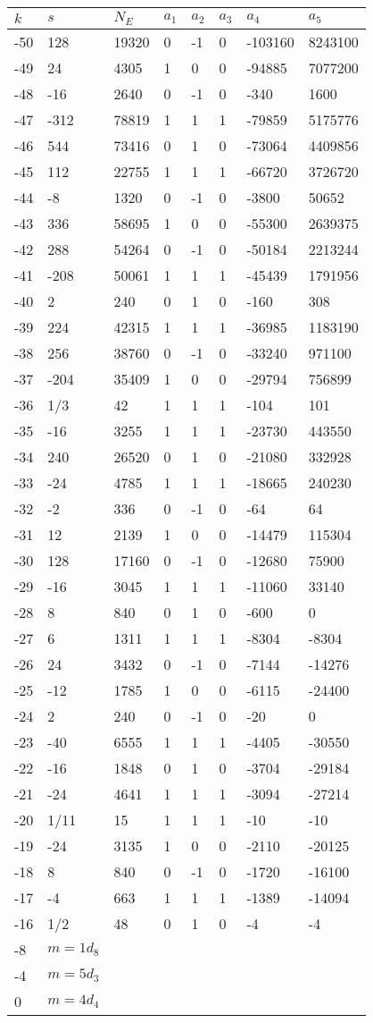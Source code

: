 \documentclass{amsart}
\begin{document}
\begin{longtable}{|l|l|l|lllll|}
\hline
$k$ & $s$ & $N_E$ & $a_1$ & $a_2$ & $a_3$ & $a_4$ & $a_5$\\
\hline
-50&128&19320&0&-1&0&-103160&8243100\\
-49&24&4305&1&0&0&-94885&7077200\\
-48&-16&2640&0&-1&0&-340&1600\\
-47&-312&78819&1&1&1&-79859&5175776\\
-46&544&73416&0&1&0&-73064&4409856\\
-45&112&22755&1&1&1&-66720&3726720\\
-44&-8&1320&0&-1&0&-3800&50652\\
-43&336&58695&1&0&0&-55300&2639375\\
-42&288&54264&0&-1&0&-50184&2213244\\
-41&-208&50061&1&1&1&-45439&1791956\\
-40&2&240&0&1&0&-160&308\\
-39&224&42315&1&1&1&-36985&1183190\\
-38&256&38760&0&-1&0&-33240&971100\\
-37&-204&35409&1&0&0&-29794&756899\\
-36&1/3&42&1&1&1&-104&101\\
-35&-16&3255&1&1&1&-23730&443550\\
-34&240&26520&0&1&0&-21080&332928\\
-33&-24&4785&1&1&1&-18665&240230\\
-32&-2&336&0&-1&0&-64&64\\
-31&12&2139&1&0&0&-14479&115304\\
-30&128&17160&0&-1&0&-12680&75900\\
-29&-16&3045&1&1&1&-11060&33140\\
-28&8&840&0&1&0&-600&0\\
-27&6&1311&1&1&1&-8304&-8304\\
-26&24&3432&0&-1&0&-7144&-14276\\
-25&-12&1785&1&0&0&-6115&-24400\\
-24&2&240&0&-1&0&-20&0\\
-23&-40&6555&1&1&1&-4405&-30550\\
-22&-16&1848&0&1&0&-3704&-29184\\
-21&-24&4641&1&1&1&-3094&-27214\\
-20&1/11&15&1&1&1&-10&-10\\
-19&-24&3135&1&0&0&-2110&-20125\\
-18&8&840&0&-1&0&-1720&-16100\\
-17&-4&663&1&1&1&-1389&-14094\\
-16&1/2&48&0&1&0&-4&-4\\
-8&$m=1d_{8}$&&\multicolumn{5}{c|}{}\\
-4&$m=5d_{3}$&&\multicolumn{5}{c|}{}\\
0&$m=4d_{4}$&&\multicolumn{5}{c|}{}\\
\hline
\end{longtable}
\end{document}
